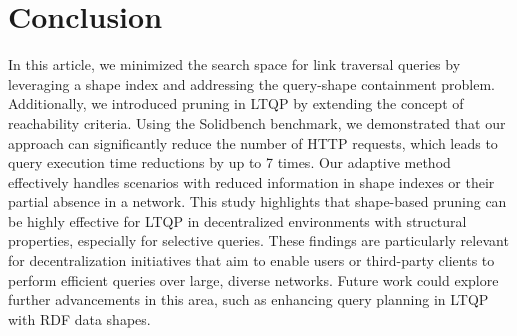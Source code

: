 \section{Conclusion}

In this article, we minimized the search space for link traversal queries by leveraging a shape index and addressing the query-shape containment problem.
Additionally, we introduced pruning in LTQP by extending the concept of reachability criteria.
Using the Solidbench benchmark, we demonstrated that our approach can significantly reduce the number of HTTP requests, which leads to query execution time reductions by up to 7 times.
Our adaptive method effectively handles scenarios with reduced information in shape indexes or their partial absence in a network.
This study highlights that shape-based pruning can be highly effective for LTQP in decentralized environments with structural properties, especially for selective queries.
These findings are particularly relevant for decentralization initiatives that aim to enable users or third-party clients to perform efficient queries over large, diverse networks.
Future work could explore further advancements in this area, such as enhancing query planning in LTQP~\cite{taelman2024towards} with RDF data shapes.

